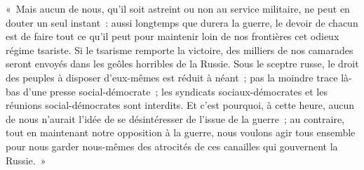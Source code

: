 \documentclass[french,twoside]{book} %
\newenvironment{quoteblock}%
  {\begin{quoting}}
  {\end{quoting}}
\newenvironment{quotebar}{%
    \def\FrameCommand{{\color{rubric!10!}\vrule width 0.5em} \hspace{0.9em}}%
    \def\OuterFrameSep{\itemsep} %
    \MakeFramed {\advance\hsize-\width \FrameRestore}
  }%
  {%
    \endMakeFramed
  }
\renewenvironment{quoteblock}%
  {%
    \savenotes
    \setstretch{0.9}
    \normalfont
    \begin{quotebar}
  }
  {%
    \end{quotebar}
    \spewnotes
  }
\begin{document}
\begin{quoteblock}
 \noindent « Mais aucun de nous, qu’il soit astreint ou non au service militaire, ne peut en douter un seul instant : aussi longtemps que durera la guerre, le devoir de chacun est de faire tout ce qu’il peut pour maintenir loin de nos frontières cet odieux régime tsariste. Si le tsarisme remporte la victoire, des milliers de nos camarades seront envoyés dans les geôles horribles de la Russie. Sous le sceptre russe, le droit des peuples à disposer d’eux-mêmes est réduit à néant ; pas la moindre trace là-bas d’une presse social-démocrate ; les syndicats sociaux-démocrates et les réunions social-démocrates sont interdits. Et c’est pourquoi, à cette heure, aucun de nous n’aurait l’idée de se désintéresser de l’issue de la guerre ; au contraire, tout en maintenant notre opposition à la guerre, nous voulons agir tous ensemble pour nous garder nous-mêmes des atrocités de ces canailles qui gouvernent la Russie. »
\end{quoteblock}
\end{document}
